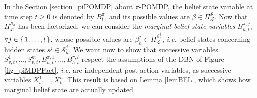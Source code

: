 In the Section \ref{section_piPOMDP} about $\pi$-POMDP, 
the belief state variable 
at time step $t \geqslant 0$ 
is denoted by $B^{\pi}_{t}$,
and its possible values are $\beta \in \Pi^{\mathcal{S}}_{\mathcal{L}}$.
Now that $\Pi^{\mathcal{S}_h}_{\mathcal{L}}$ has been factorized,
we can consider the \textit{marginal belief state variables}
$B^{\pi,j}_{h,t}$, $\forall j \in \left\{ \left. 1,\ldots,l \right. \right\}$, 
whose possible values are $\beta_h^j \in \Pi^{\mathcal{S}^j_h}_{\mathcal{L}}$,
\textit{i.e.} belief states concerning hidden states $s^j \in \mathcal{S}^j_h$.
We want now to show that successive variables 
$S^1_{v,t},\ldots,S^m_{v,t},B^{\pi,1}_{h,t},\ldots,B^{\pi,l}_{h,t}$
respect the assumptions of the DBN of
Figure \ref{fig_piMDPFact},
\textit{i.e.} are independent post-action variables,
as successive variables $X^1_t, \ldots, X^n_t$.
This result is based on Lemma
\ref{lemBEL}, which shows how marginal belief state are actually updated. 
 


